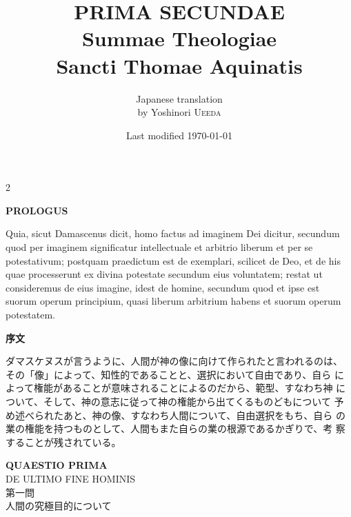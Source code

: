 \documentclass[paper=a4paper,fontsize=10pt,jafontsize=9pt,titlepage]{jlreq}
\title{{\bfseries PRIMA SECUNDAE}\\{\Huge Summae Theologiae}\\Sancti Thomae
Aquinatis}
\author{Japanese translation\\by Yoshinori {\scshape Ueeda}}
\date{Last modified \today}
\begin{document}
\maketitle
\pagestyle{fancy}

\begin{paracol}{2}

{\bfseries PROLOGUS}

Quia, sicut Damascenus dicit, homo factus ad
imaginem Dei dicitur, secundum quod per imaginem significatur
intellectuale et arbitrio liberum et per se potestativum; postquam
praedictum est de exemplari, scilicet de Deo, et de his quae
processerunt ex divina potestate secundum eius voluntatem; restat ut
consideremus de eius imagine, idest de homine, secundum quod et ipse est
suorum operum principium, quasi liberum arbitrium habens et suorum
operum potestatem.

\switchcolumn

{\bfseries 序文}

ダマスケヌスが言うように、人間が神の像に向けて作られたと言われるのは、
 その「像」によって、知性的であることと、選択において自由であり、自ら
 によって権能があることが意味されることによるのだから、範型、すなわち神
 について、そして、神の意志に従って神の権能から出てくるものどもについて
 予め述べられたあと、神の像、すなわち人間について、自由選択をもち、自ら
 の業の権能を持つものとして、人間もまた自らの業の根源であるかぎりで、考
 察することが残されている。

\end{paracol}

\newpage
\begin{center}
 {\Large {\bfseries QUAESTIO PRIMA}}\\
 {\large DE ULTIMO FINE HOMINIS}\\

 {\Large 第一問\\人間の究極目的について}
\end{center}
\end{document}
